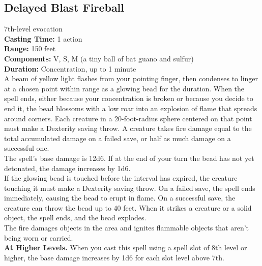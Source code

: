 \documentclass[11pt, A4paper, english]{article}
\begin{document}
		\subsection{Delayed Blast Fireball}
7th-level evocation \\
\textbf{Casting Time:} 1 action \\
\textbf{Range:} 150 feet \\
\textbf{Components:} V, S, M (a tiny ball of bat guano and sulfur) \\
\textbf{Duration:} Concentration, up to 1 minute \\
A beam of yellow light flashes from your pointing finger, then condenses to linger at a chosen point within range as a glowing bead for the duration. When the spell ends, either because your concentration is broken or because you decide to end it, the bead blossoms with a low roar into an explosion of flame that spreads around corners. Each creature in a 20-foot-radius sphere centered on that point must make a Dexterity saving throw. A creature takes fire damage equal to the total accumulated damage on a failed save, or half as much damage on a successful one. \\
The spell’s base damage is 12d6. If at the end of your turn the bead has not yet detonated, the damage increases by 1d6. \\
If the glowing bead is touched before the interval has expired, the creature touching it must make a Dexterity saving throw. On a failed save, the spell ends immediately, causing the bead to erupt in flame. On a successful save, the creature can throw the bead up to 40 feet. When it strikes a creature or a solid object, the spell ends, and the bead explodes. \\
The fire damages objects in the area and ignites flammable objects that aren’t being worn or carried. \\
\textbf{At Higher Levels.} When you cast this spell using a spell slot of 8th level or higher, the base damage increases by 1d6 for each slot level above 7th.
\end{document}
